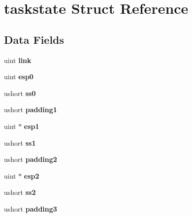 \hypertarget{structtaskstate}{}\section{taskstate Struct Reference}
\label{structtaskstate}
\subsection*{Data Fields}
\begin{DoxyCompactItemize}
\item 
\mbox{\label{structtaskstate_a31a48a737b004273004ba8473ab6b0ed}} 
uint {\bfseries link}
\item 
\mbox{\label{structtaskstate_a41b3e1d46a5068485eb6714974a979d6}} 
uint {\bfseries esp0}
\item 
\mbox{\label{structtaskstate_a574e97ea3fd87f314da88afec3c6f574}} 
ushort {\bfseries ss0}
\item 
\mbox{\label{structtaskstate_a6b87ceb039ec11ccd265818673c53df5}} 
ushort {\bfseries padding1}
\item 
\mbox{\label{structtaskstate_a7ec69acf5f95163bd1ca2548fb0c541a}} 
uint $\ast$ {\bfseries esp1}
\item 
\mbox{\label{structtaskstate_ac70c36414956cfee04c733a5b530d8ef}} 
ushort {\bfseries ss1}
\item 
\mbox{\label{structtaskstate_ae1bd6ae664d5899c3e118c21a27ba065}} 
ushort {\bfseries padding2}
\item 
\mbox{\label{structtaskstate_af206a117571ede3752b043e4e8cc6016}} 
uint $\ast$ {\bfseries esp2}
\item 
\mbox{\label{structtaskstate_a573d8f57ef11630e782d8b7c924f28ce}} 
ushort {\bfseries ss2}
\item 
\mbox{\label{structtaskstate_a7989f7ea66e6e2100ef68c9e6964c231}} 
ushort {\bfseries padding3}
\item 
\mbox{\label{structtaskstate_ac891b558913b4528fd2c9351c99da201}} 

\end{DoxyCompactItemize}
